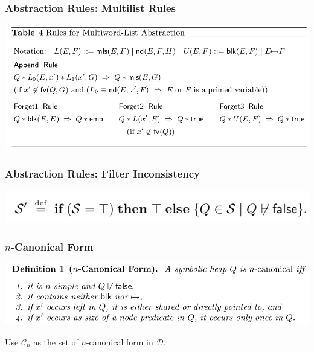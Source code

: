 \documentclass[aspectratio=1610, 13pt]{beamer}
\begin{document}
\begin{frame}\frametitle{Abstraction Rules: Multilist Rules}
\begin{center}
\includegraphics[scale=0.4]{mtw.png}
\end{center}
\end{frame}

\begin{frame}\frametitle{Abstraction Rules: Filter Inconsistency}
\begin{center}
\includegraphics[scale=0.4]{inc.png}
\end{center}
\end{frame}

\begin{frame}\frametitle{$n$-Canonical  Form}
\begin{center}
\includegraphics[scale=0.4]{ncan.png}
\end{center}
Use $\mathcal{C}_n$ as the set of $n$-canonical form in $\mathcal{D}$.


\end{frame}
\end{document}
